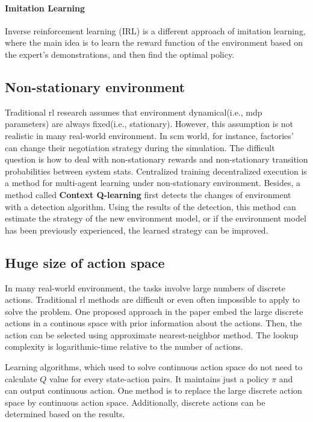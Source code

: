 \paragraph{Imitation Learning\parencite{DBLP:journals/corr/HesterVPLSPSDOA17}} Inverse reinforcement learning (IRL) is a different approach of imitation learning, where the main idea is to learn the reward function of the environment based on the expert’s demonstrations, and then find the optimal policy.

\subsection{Non-stationary environment}
Traditional \gls{rl} research assumes that environment dynamical(i.e., \gls{mdp} parameters) are always fixed(i.e., stationary). However, this assumption is not realistic in many real-world environment. In \gls{scm} world, for instance, factories' can change their negotiation strategy during the simulation. The difficult question is how to deal with non-stationary rewards and non-stationary transition probabilities between system stats. Centralized training decentralized execution\parencite{maddpg2017} is a method for multi-agent learning under non-stationary environment. Besides, a method called \textbf{Context Q-learning}\parencite{Padakandla_2020} first detects the changes of environment with a detection algorithm. Using the results of the detection, this method can estimate the strategy of the new environment model, or if the environment model has been previously experienced, the learned strategy can be improved.

\subsection{Huge size of action space}
In many real-world environment, the tasks involve large numbers of discrete actions. Traditional \gls{rl} methods are difficult or even often impossible to apply to solve the problem. One proposed approach in the paper \parencite{dulacarnold2016deep} embed the large discrete actions in a continous space with prior information about the actions. Then, the action can be selected using approximate nearest-neighbor method. The lookup complexity is logarithmic-time relative to the number of actions.

Learning algorithms, which used to solve continuous action space do not need to calculate $Q$ value for every state-action pairs. It maintains just a policy $\pi$ and can output continuous action. One method is to replace the large discrete action space by continuous action space. Additionally, discrete actions can be determined based on the results.

